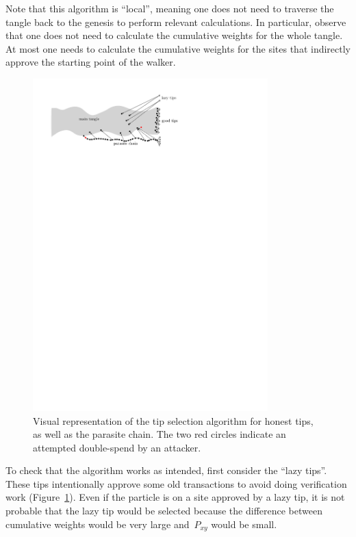 \documentclass[12pt]{article}
\begin{document}
Note that this algorithm is ``local'', meaning one does not need
 to traverse the tangle back to the genesis to perform relevant calculations.
In particular, 
observe that one does not need to calculate the cumulative
weights for the whole tangle. At most one needs to calculate the 
cumulative weights 
for the sites that indirectly approve the starting point
of the walker.


\begin{figure}
 \centering \includegraphics[width=0.81\textwidth]{tip_Markov} 
\caption{Visual representation of the tip selection algorithm for 
honest tips, as well as the parasite chain. The two red circles 
indicate an attempted double-spend by an attacker.
}
\label{f_tip_Markov}
\end{figure}

To check that the algorithm works as intended, first consider the ``lazy
tips''. These tips intentionally approve some old transactions
to avoid doing verification work (Figure~\ref{f_tip_Markov}).
Even if the particle 
is on a site approved by a lazy tip, it is not probable that the lazy
tip would be selected because the difference between cumulative
 weights would be very large and~$P_{xy}$ would be small.
\end{document}
